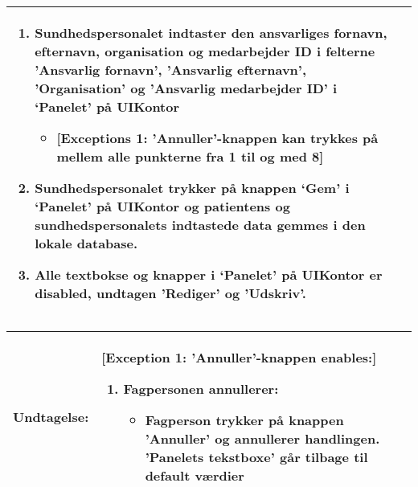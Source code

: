\begin{table}[H]
\begin{tabular}{|p{5.5cm}|p{10cm}|}
{\begin{enumerate}
\item{Sundhedspersonalet indtaster den ansvarliges fornavn, efternavn, organisation og medarbejder ID i felterne 'Ansvarlig fornavn', 'Ansvarlig efternavn', 'Organisation' og 'Ansvarlig medarbejder ID' i ‘Panelet’ på UIKontor}
{\begin{itemize}[label=$\circ$]
\item {[Exceptions 1: 'Annuller'-knappen kan trykkes på mellem alle punkterne fra 1 til og med 8] }
\end{itemize}}
\item{Sundhedspersonalet trykker på knappen ‘Gem’ i ‘Panelet’ på UIKontor og patientens og sundhedspersonalets indtastede data gemmes i den lokale database.}
\item{Alle textbokse og knapper i ‘Panelet’ på UIKontor er disabled, undtagen 'Rediger' og 'Udskriv'.}
\end{enumerate}}\\\hline
\end{tabular}
\end{table}

\begin{table}[H]
\begin{tabular}{|p{5.5cm}|p{10cm}|}
\hline
\textbf{Undtagelse:} & [Exception 1: 'Annuller'-knappen enables:]
\begin{enumerate}
\item {Fagpersonen annullerer: 
\begin{itemize}[label=$\circ$]
\item { Fagperson trykker på knappen 'Annuller' og annullerer handlingen. 'Panelets tekstboxe' går tilbage til default værdier }
\end{itemize}}
\end{enumerate}\\\hline
\end{tabular}
\end{table}

